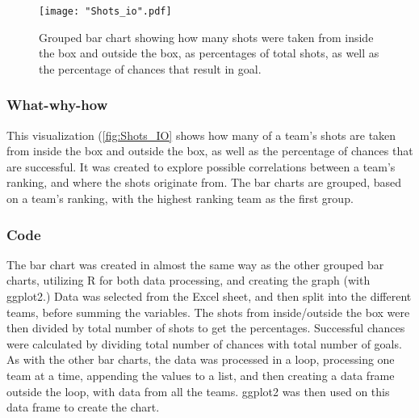 \documentclass[Report.tex]{subfiles}
\begin{document}
\begin{figure}
\center
\texttt{[image: "Shots\_io".pdf]}
\caption{Grouped bar chart showing how many shots were taken from inside the
box and outside the box, as percentages of total shots, as well as the
percentage of chances that result in goal.}
\label{Fig:Shots_IO} 
\end{figure}

\subsubsection{What-why-how}
This visualization (\ref{fig:Shots_IO} shows how many of a team's shots are taken from inside the
box and outside the box, as well as the percentage of chances that are successful.
It was created to explore possible correlations between a team's ranking, and
where the shots originate from. 
The bar charts are grouped, based on a team's ranking, with the highest ranking
team as the first group. 

\subsubsection{Code}
The bar chart was created in almost the same way as the other grouped bar
charts, utilizing R for both data processing, and creating the graph (with
ggplot2.)
Data was selected from the Excel sheet, and then split into the different teams,
before summing the variables. The shots from inside/outside the box were then
divided by total number of shots to get the percentages. Successful chances were
calculated by dividing total number of chances with total number of goals.
As with the other bar charts, the data was processed in a loop, processing one
team at a time, appending the values to a list, and then creating a data frame
outside the loop, with data from all the teams. ggplot2 was then used on this
data frame to create the chart.
\end{document}
